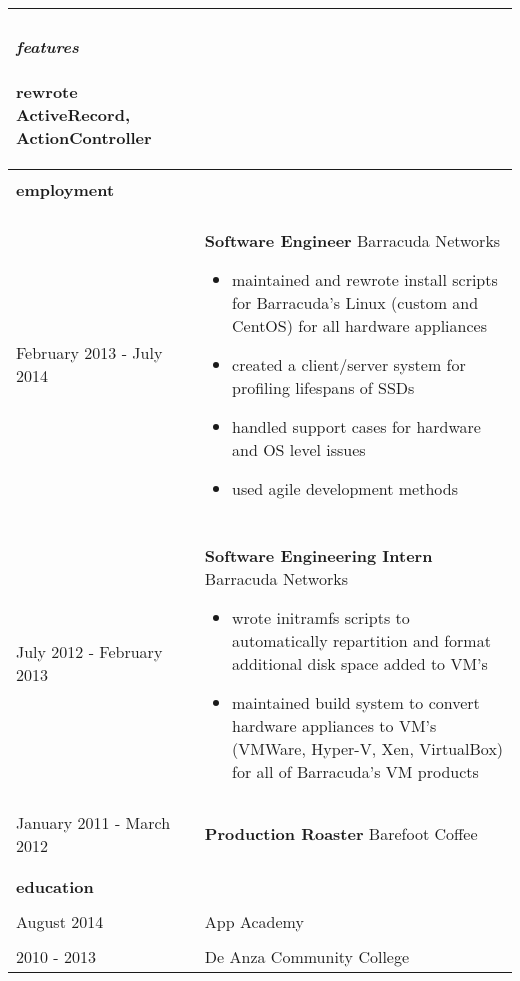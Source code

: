 \documentclass{article}
\begin{document}
\begin{tabular}{L{3cm} R{14.5cm}}
    \paragraph{\textit{features}}{
        rewrote ActiveRecord, ActionController
    }

    \\ \hline \\

    \large{\textbf{employment}} \\\\
    \normalsize

    February 2013 - July 2014
    
    &

    \textbf{Software Engineer}
    Barracuda Networks

    \begin{itemize}
        \item maintained and rewrote install scripts for Barracuda's Linux 
            (custom and CentOS) for all hardware appliances
        \item created a client/server system for profiling lifespans of
            SSDs
        \item handled support cases for hardware and OS level issues
        \item used agile development methods
    \end{itemize}

    \\\\
    
    July 2012 - February 2013
    &
    \textbf{Software Engineering Intern}
    Barracuda Networks

    \begin{itemize}
        \item wrote initramfs scripts to automatically repartition and 
            format additional disk space added to VM's
        \item maintained build system to convert hardware appliances to VM's
            (VMWare, Hyper-V, Xen, VirtualBox) for all of Barracuda's VM products
    \end{itemize}

    \\\\
    
    January 2011 - March 2012
    &
    \textbf{Production Roaster}
    Barefoot Coffee
    
    \\\\ \hline \\

    \large{\textbf{education}} \\\\
    \normalsize

    August 2014 & App Academy \\

    \\

    2010 - 2013 & De Anza Community College \\
\end{tabular}
\end{document}
